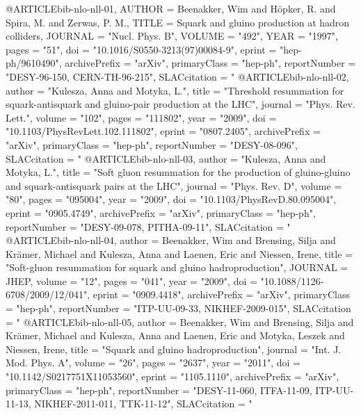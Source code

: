 @ARTICLE{bib-nlo-nll-01,
  AUTHOR       = {Beenakker, Wim and H{\"o}pker, R. and Spira, M. and Zerwas, P. M.},
  TITLE        = {Squark and gluino production at hadron colliders},
  JOURNAL      = "Nucl. Phys. B",
  VOLUME       = "492",
  YEAR         = "1997",
  pages        = "51",
  doi          = "10.1016/S0550-3213(97)00084-9",
      eprint         = "hep-ph/9610490",
      archivePrefix  = "arXiv",
      primaryClass   = "hep-ph",
      reportNumber   = "DESY-96-150, CERN-TH-96-215",
  SLACcitation   = "%
}
@ARTICLE{bib-nlo-nll-02,
  author         = "Kulesza, Anna and Motyka, L.",
  title          = "{Threshold resummation for squark-antisquark and
                     gluino-pair production at the {LHC}}",
  journal        = "Phys. Rev. Lett.",
  volume         = "102",
  pages          = "111802",
  year           = "2009",
  doi            = "10.1103/PhysRevLett.102.111802",
      eprint         = "0807.2405",
      archivePrefix  = "arXiv",
      primaryClass   = "hep-ph",
      reportNumber   = "DESY-08-096",
  SLACcitation   = "%
}
@ARTICLE{bib-nlo-nll-03,
  author         = "Kulesza, Anna and Motyka, L.",
  title          = "{Soft gluon resummation for the production of
                     gluino-gluino and squark-antisquark pairs at the {LHC}}",
  journal        = "Phys. Rev. D",
  volume         = "80",
  pages          = "095004",
  year           = "2009",
  doi            = "10.1103/PhysRevD.80.095004",
      eprint         = "0905.4749",
      archivePrefix  = "arXiv",
      primaryClass   = "hep-ph",
      reportNumber   = "DESY-09-078, PITHA-09-11",
  SLACcitation   = "%
}
@ARTICLE{bib-nlo-nll-04,
  author         = {Beenakker, Wim and Brensing, Silja and Kr{\"a}mer, Michael
                    and Kulesza, Anna and Laenen, Eric and Niessen, Irene},
  title          = "{Soft-gluon resummation for squark and gluino hadroproduction}",
  JOURNAL        = {JHEP},
  volume         = "12",
  pages          = "041",
  year           = "2009",
  doi            = "10.1088/1126-6708/2009/12/041",
      eprint         = "0909.4418",
      archivePrefix  = "arXiv",
      primaryClass   = "hep-ph",
      reportNumber   = "ITP-UU-09-33, NIKHEF-2009-015",
  SLACcitation   = "%
}
@ARTICLE{bib-nlo-nll-05,
  author         = {Beenakker, Wim and Brensing, Silja and Kr{\"a}mer, Michael and
                    Kulesza, Anna and Laenen, Eric and Motyka, Leszek and Niessen, Irene},
  title          = "{Squark and gluino hadroproduction}",
  journal        = "Int. J. Mod. Phys. A",
  volume         = "26",
  pages          = "2637",
  year           = "2011",
  doi            = "10.1142/S0217751X11053560",
      eprint         = "1105.1110",
      archivePrefix  = "arXiv",
      primaryClass   = "hep-ph",
      reportNumber   = "DESY-11-060, ITFA-11-09, ITP-UU-11-13, NIKHEF-2011-011,
                        TTK-11-12",
  SLACcitation   = "%
}
